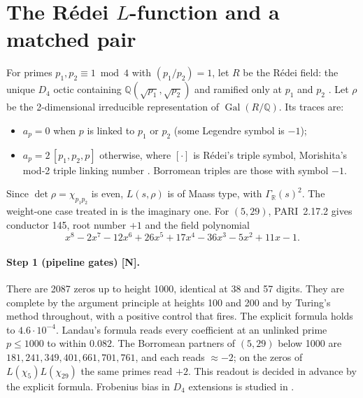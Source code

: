 \documentclass[11pt]{article}
\theoremstyle{remark}
\newcommand{\tagN}{\textbf{[N]}}
\begin{document}
\section{The Rédei $L$-function and a matched pair}\label{sec:redei}

For primes $p_1,p_2\equiv1\bmod4$ with $(p_1/p_2)=1$, let $R$ be the Rédei field: the unique $D_4$ octic containing $\mathbb Q(\sqrt{p_1},\sqrt{p_2})$ and ramified only at $p_1$ and $p_2$ \cite{redei39}. Let $\rho$ be the 2-dimensional irreducible representation of $\operatorname{Gal}(R/\mathbb Q)$. Its traces are:
\begin{itemize}
\item $a_p=0$ when $p$ is linked to $p_1$ or $p_2$ (some Legendre symbol is $-1$);
\item $a_p=2\,[p_1,p_2,p]$ otherwise, where $[\cdot]$ is Rédei's triple symbol, Morishita's mod-2 triple linking number \cite{morishita}. Borromean triples are those with symbol $-1$.
\end{itemize}
Since $\det\rho=\chi_{p_1p_2}$ is even, $L(s,\rho)$ is of Maass type, with $\Gamma_{\mathbb R}(s)^2$. The weight-one case treated in \cite{amano13} is the imaginary one. For $(5,29)$, PARI~2.17.2 gives conductor 145, root number $+1$ and the field polynomial
\[
x^8-2x^7-12x^6+26x^5+17x^4-36x^3-5x^2+11x-1.
\]

\paragraph{Step 1 (pipeline gates) \tagN.} There are 2087 zeros up to height 1000, identical at 38 and 57 digits. They are complete by the argument principle at heights 100 and 200 and by Turing's method throughout, with a positive control that fires. The explicit formula holds to $4.6\cdot10^{-4}$. Landau's formula reads every coefficient at an unlinked prime $p\le1000$ to within $0.082$. The Borromean partners of $(5,29)$ below 1000 are $181,241,349,401,661,701,761$, and each reads $\approx-2$; on the zeros of $L(\chi_5)L(\chi_{29})$ the same primes read $+2$. This readout is decided in advance by the explicit formula. Frobenius bias in $D_4$ extensions is studied in \cite{bailleul21}.
\end{document}
